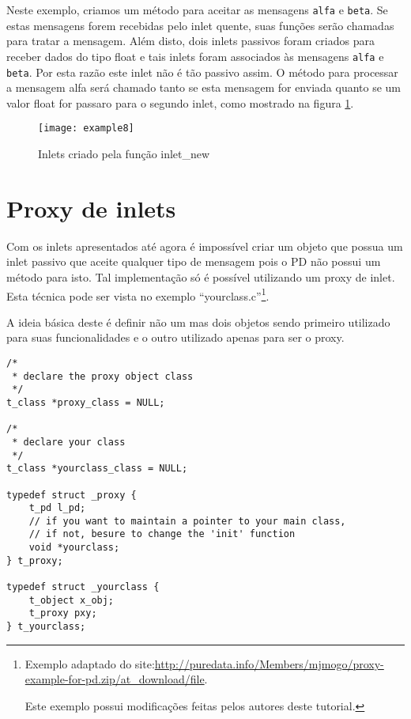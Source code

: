 Neste exemplo, criamos um método para aceitar as mensagens \texttt{alfa} e \texttt{beta}.
Se estas mensagens forem recebidas pelo inlet quente, suas funções serão chamadas
para tratar a mensagem.
Além disto, dois inlets passivos foram criados para receber dados do tipo float
e tais inlets foram associados às mensagens \texttt{alfa} e \texttt{beta}.
Por esta razão este inlet não é tão passivo assim.
O método para processar a mensagem alfa será chamado tanto se esta
mensagem for enviada quanto se um valor float for passaro para o segundo inlet,
como mostrado na figura \ref{fig:example8}.

\begin{figure}[h!]
\centering
\texttt{[image: example8]}
\caption{Inlets criado pela função inlet\_new}
\label{fig:example8}
\end{figure}

\section{Proxy de inlets}
Com os inlets apresentados até agora é impossível criar um objeto que possua
um inlet passivo que aceite qualquer tipo de mensagem pois o PD não possui um
método para isto.
Tal implementação só é possível utilizando um proxy de inlet.
Esta técnica pode ser vista no exemplo ``yourclass.c''\footnote{Exemplo adaptado do
site:\url{http://puredata.info/Members/mjmogo/proxy-example-for-pd.zip/at_download/file}.

Este exemplo possui modificações feitas pelos autores deste tutorial.}.

A ideia básica deste \external é definir não um mas dois objetos sendo primeiro
utilizado para suas funcionalidades e o outro utilizado apenas para ser o
proxy.

\begin{lstlisting}[caption=Estruturas de dados para um proxy]
/*
 * declare the proxy object class
 */
t_class *proxy_class = NULL;

/*
 * declare your class
 */
t_class *yourclass_class = NULL;

typedef struct _proxy {
	t_pd l_pd;
	// if you want to maintain a pointer to your main class,
	// if not, besure to change the 'init' function
	void *yourclass;
} t_proxy;

typedef struct _yourclass {
	t_object x_obj;
	t_proxy pxy;
} t_yourclass;

\end{lstlisting}

